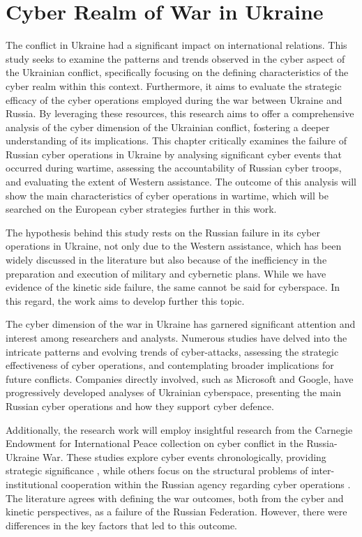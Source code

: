 \chapter{Cyber Realm of War in Ukraine}

The conflict in Ukraine had a significant impact on international relations. This study seeks to examine the patterns and trends observed in the cyber aspect of the Ukrainian conflict, specifically focusing on the defining characteristics of the cyber realm within this context. Furthermore, it aims to evaluate the strategic efficacy of the cyber operations employed during the war between Ukraine and Russia.  By leveraging these resources, this research aims to offer a comprehensive analysis of the cyber dimension of the Ukrainian conflict, fostering a deeper understanding of its implications. This chapter critically examines the failure of Russian cyber operations in Ukraine by analysing significant cyber events that occurred during wartime, assessing the accountability of Russian cyber troops, and evaluating the extent of Western assistance. The outcome of this analysis will show the main characteristics of cyber operations in wartime, which will be searched on the European cyber strategies further in this work.

The hypothesis behind this study rests on the Russian failure in its cyber operations in Ukraine, not only due to the Western assistance, which has been widely discussed in the literature but also because of the inefficiency in the preparation and execution of military and cybernetic plans. While we have evidence of the kinetic side failure, the same cannot be said for cyberspace. In this regard, the work aims to develop further this topic.

The cyber dimension of the war in Ukraine has garnered significant attention and interest among researchers and analysts. Numerous studies have delved into the intricate patterns and evolving trends of cyber-attacks, assessing the strategic effectiveness of cyber operations, and contemplating broader implications for future conflicts. Companies directly involved, such as Microsoft and Google, have progressively developed analyses of Ukrainian cyberspace, presenting the main Russian cyber operations and how they support cyber defence.

Additionally, the research work will employ insightful research from the Carnegie Endowment for International Peace collection on cyber conflict in the Russia-Ukraine War. These studies explore cyber events chronologically, providing strategic significance \parencite{levite_2023_integrating, lewis_2022_cyber}, while others focus on the structural problems of inter-institutional cooperation within the Russian agency regarding cyber operations \autocite{wilde_2022_cyber}. The literature agrees with defining the war outcomes, both from the cyber and kinetic perspectives, as a failure of the Russian Federation. However, there were differences in the key factors that led to this outcome.

